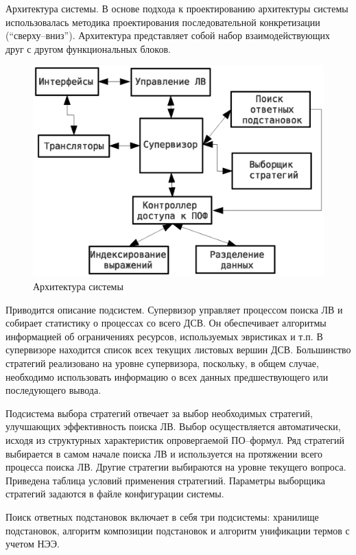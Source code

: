 \documentclass[a4paper]{report}
\begin{document}
Архитектура системы. В основе подхода к проектированию архитектуры системы использовалась методика проектирования последовательной конкретизации (``сверху--вниз''). Архитектура представляет собой набор взаимодействующих друг с другом функциональных блоков.
\begin{figure}[htb]
    \centering
    \includegraphics[width=0.5\linewidth]{pics/Design1.eps}
    \caption{Архитектура системы}
    \label{fig:design1}
\end{figure}
Приводится описание подсистем.
Супервизор управляет процессом поиска ЛВ и собирает статистику о процессах со всего ДСВ. Он обеспечивает алгоритмы информацией об ограничениях ресурсов, используемых эвристиках и т.п. В супервизоре находится список всех текущих листовых вершин ДСВ. Большинство стратегий реализовано на уровне супервизора, поскольку, в общем случае, необходимо использовать информацию о всех данных предшествующего или последующего вывода.

Подсистема выбора стратегий отвечает за выбор необходимых стратегий, улучшающих эффективность поиска ЛВ. Выбор осуществляется автоматически, исходя из структурных характеристик опровергаемой ПО--формул. Ряд стратегий выбирается в самом начале поиска ЛВ и используется на протяжении всего процесса поиска ЛВ. Другие стратегии выбираются на уровне текущего вопроса. Приведена таблица условий применения стратегиий. Параметры выборщика стратегий задаются в файле конфигурации системы.

Поиск ответных подстановок включает в себя три подсистемы: хранилище подстановок, алгоритм композиции подстановок и алгоритм унификации термов с учетом НЭЭ.
\end{document}

